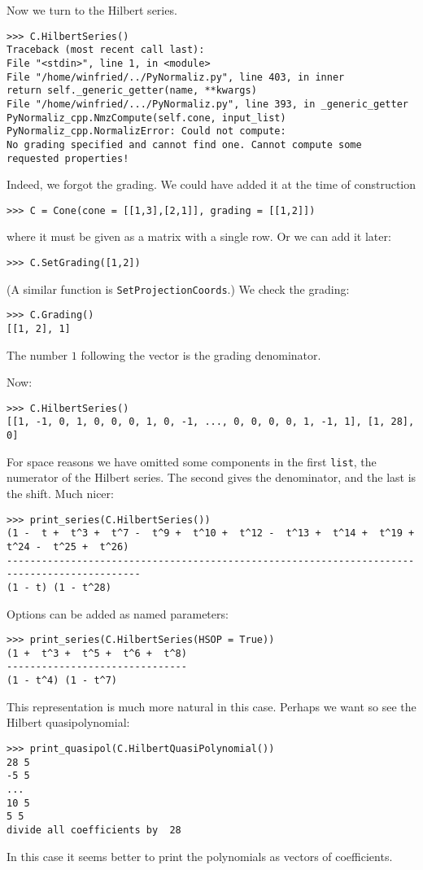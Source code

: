 \documentclass[12pt,a4paper]{scrartcl}
\theoremstyle{definition}
\begin{document}
\begin{small}
Now we turn to the Hilbert series.
\begin{Verbatim}
>>> C.HilbertSeries()
Traceback (most recent call last):
File "<stdin>", line 1, in <module>
File "/home/winfried/../PyNormaliz.py", line 403, in inner
return self._generic_getter(name, **kwargs)
File "/home/winfried/.../PyNormaliz.py", line 393, in _generic_getter
PyNormaliz_cpp.NmzCompute(self.cone, input_list)
PyNormaliz_cpp.NormalizError: Could not compute: 
No grading specified and cannot find one. Cannot compute some requested properties!
\end{Verbatim}
Indeed, we forgot the grading. We could have added it at the time of construction
\begin{Verbatim}
>>> C = Cone(cone = [[1,3],[2,1]], grading = [[1,2]])
\end{Verbatim}
where it must be given as a matrix with a single row. Or we can add it later:
\begin{Verbatim}
>>> C.SetGrading([1,2])
\end{Verbatim}
(A similar function is \verb|SetProjectionCoords|.) We check the grading:
\begin{Verbatim}
>>> C.Grading()
[[1, 2], 1]
\end{Verbatim}
The number $1$ following the vector is the grading denominator.

Now:
\begin{Verbatim}
>>> C.HilbertSeries()
[[1, -1, 0, 1, 0, 0, 0, 1, 0, -1, ..., 0, 0, 0, 0, 1, -1, 1], [1, 28], 0]
\end{Verbatim}
For space reasons we have omitted some components in the first \verb|list|, the numerator of the Hilbert series. The second gives the denominator, and the last is the shift. Much nicer:
\begin{Verbatim}
>>> print_series(C.HilbertSeries())
(1 -  t +  t^3 +  t^7 -  t^9 +  t^10 +  t^12 -  t^13 +  t^14 +  t^19 +  t^24 -  t^25 +  t^26)
---------------------------------------------------------------------------------------------
(1 - t) (1 - t^28) 
\end{Verbatim}

Options can be added as named parameters:
\begin{Verbatim}
>>> print_series(C.HilbertSeries(HSOP = True))
(1 +  t^3 +  t^5 +  t^6 +  t^8)
-------------------------------
(1 - t^4) (1 - t^7)   
\end{Verbatim}
This representation is much more natural in this case. Perhaps we want so see the Hilbert quasipolynomial:
\begin{Verbatim}
>>> print_quasipol(C.HilbertQuasiPolynomial())
28 5
-5 5
...
10 5
5 5
divide all coefficients by  28
\end{Verbatim}
In this case it seems better to print the polynomials as vectors of coefficients.


\end{small}
\end{document}
